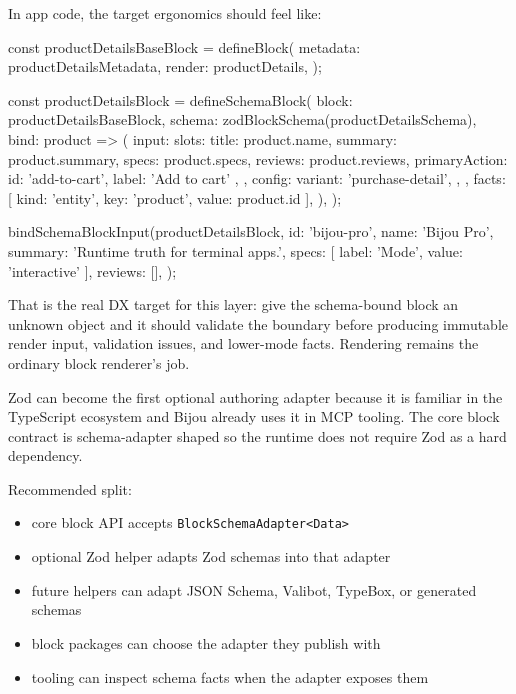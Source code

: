 In app code, the target ergonomics should feel like:

\begin{CodeBlock}
const productDetailsBaseBlock = defineBlock({
  metadata: productDetailsMetadata,
  render: productDetails,
});

const productDetailsBlock = defineSchemaBlock({
  block: productDetailsBaseBlock,
  schema: zodBlockSchema(productDetailsSchema),
  bind: product => ({
    input: {
      slots: {
        title: product.name,
        summary: product.summary,
        specs: product.specs,
        reviews: product.reviews,
        primaryAction: { id: 'add-to-cart', label: 'Add to cart' },
      },
      config: {
        variant: 'purchase-detail',
      },
    },
    facts: [{ kind: 'entity', key: 'product', value: product.id }],
  }),
});

bindSchemaBlockInput(productDetailsBlock, {
  id: 'bijou-pro',
  name: 'Bijou Pro',
  summary: 'Runtime truth for terminal apps.',
  specs: [{ label: 'Mode', value: 'interactive' }],
  reviews: [],
});
\end{CodeBlock}

That is the real DX target for this layer: give the schema-bound block an unknown object and it should validate the boundary before producing immutable render input, validation issues, and lower-mode facts. Rendering remains the ordinary block renderer's job.

Zod can become the first optional authoring adapter because it is familiar in the TypeScript ecosystem and Bijou already uses it in MCP tooling. The core block contract is schema-adapter shaped so the runtime does not require Zod as a hard dependency.

Recommended split:

\begin{itemize}
\tightlist
\item
  core block API accepts \texttt{B\allowbreak{}l\allowbreak{}o\allowbreak{}c\allowbreak{}k\allowbreak{}S\allowbreak{}c\allowbreak{}h\allowbreak{}e\allowbreak{}m\allowbreak{}a\allowbreak{}A\allowbreak{}d\allowbreak{}a\allowbreak{}p\allowbreak{}t\allowbreak{}e\allowbreak{}r\allowbreak{}<\allowbreak{}D\allowbreak{}a\allowbreak{}t\allowbreak{}a\allowbreak{}>}
\item
  optional Zod helper adapts Zod schemas into that adapter
\item
  future helpers can adapt JSON Schema, Valibot, TypeBox, or generated schemas
\item
  block packages can choose the adapter they publish with
\item
  tooling can inspect schema facts when the adapter exposes them
\end{itemize}

